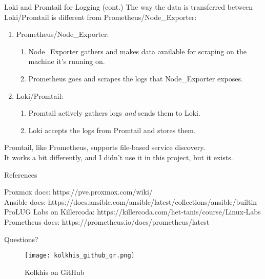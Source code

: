 \documentclass[14pt,compress,usenames,dvipsnames,aspectratio=169]{beamer}
\begin{document}
\begin{frame}{Loki and Promtail for Logging (cont.)}
    The way the data is transferred between Loki/Promtail is different from Prometheus/Node\_Exporter:
    \begin{enumerate}
        \item{Prometheus/Node\_Exporter:} 
        \begin{enumerate}
            \item{Node\_Exporter gathers and makes data available for scraping on the machine it's running on.} 
            \item{Prometheus goes and scrapes the logs that Node\_Exporter exposes.} 
        \end{enumerate}
        \item{Loki/Promtail:} 
        \begin{enumerate}
            \item{Promtail actively gathers logs \textit{and} sends them to Loki.} 
            \item{Loki accepts the logs from Promtail and stores them.} 
        \end{enumerate}
    \end{enumerate}
    Promtail, like Prometheus, supports file-based service discovery. \\
    It works a bit differently, and I didn't use it in this project, but it exists.
\end{frame}


\begin{frame}{References}
    
        Proxmox docs: https://pve.proxmox.com/wiki/  \\
        Ansible docs: https://docs.ansible.com/ansible/latest/collections/ansible/builtin  \\
        ProLUG Labs on Killercoda: https://killercoda.com/het-tanis/course/Linux-Labs \\
        Prometheus docs: https://prometheus.io/docs/prometheus/latest \\
    
\end{frame}

\begin{frame}{Questions?}
    \begin{figure}
        \centering
        \texttt{[image: kolkhis\_github\_qr.png]}
        \caption{Kolkhis on GitHub}
        \label{}
    \end{figure}
\end{frame}
\end{document}

